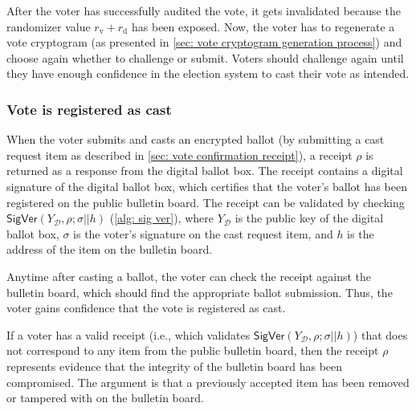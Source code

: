 After the voter has successfully audited the vote, it gets invalidated because the randomizer value $r_\mathrm{v} + r_\mathrm{d}$ has been exposed. Now, the voter has to regenerate a vote cryptogram (as presented in \cref{sec: vote cryptogram generation process}) and choose again whether to challenge or submit. Voters should challenge again until they have enough confidence in the election system to cast their vote as intended.

 
\subsubsection{Vote is registered as cast} \label{sec: vote is registered as cast}
When the voter submits and casts an encrypted ballot (by submitting a cast request item as described in \cref{sec: vote confirmation receipt}), a receipt $\rho$ is returned as a response from the digital ballot box. The receipt contains a digital signature of the digital ballot box, which certifies that the voter's ballot has been registered on the public bulletin board. The receipt can be validated by checking $\mathsf{SigVer} (Y_\mathcal{D}, \rho; \sigma || h)$ (\cref{alg: sig ver}), where $Y_\mathcal{D}$ is the public key of the digital ballot box, $\sigma$ is the voter's signature on the cast request item, and $h$ is the address of the item on the bulletin board.

Anytime after casting a ballot, the voter can check the receipt against the bulletin board, which should find the appropriate ballot submission. Thus, the voter gains confidence that the vote is registered as cast.

If a voter has a valid receipt (i.e., which validates $\mathsf{SigVer} (Y_\mathcal{D}, \rho; \sigma || h)$) that does not correspond to any item from the public bulletin board, then the receipt $\rho$ represents evidence that the integrity of the bulletin board has been compromised. The argument is that a previously accepted item has been removed or tampered with on the bulletin board.
